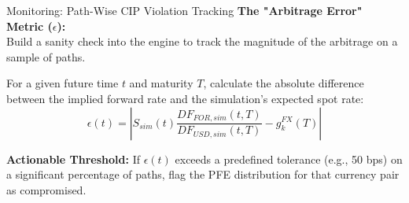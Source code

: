 \documentclass{beamer}
\begin{document}
%		
%		
%	
%		
%	
	\begin{frame}{Monitoring: Path-Wise CIP Violation Tracking}
		\textbf{The "Arbitrage Error" Metric ($\epsilon$):} \\
		Build a sanity check into the engine to track the magnitude of the arbitrage on a sample of paths.
		
		\vspace{0.3cm}
		For a given future time $t$ and maturity $T$, calculate the absolute difference between the implied forward rate and the simulation's expected spot rate:
		$$\epsilon(t) = \left| S_{sim}(t) \frac{DF_{FOR, sim}(t,T)}{DF_{USD, sim}(t,T)} - g_k^{FX}(T) \right|$$
		
		\vspace{0.3cm}
		\textbf{Actionable Threshold:}
		If $\epsilon(t)$ exceeds a predefined tolerance (e.g., 50 bps) on a significant percentage of paths, flag the PFE distribution for that currency pair as compromised.
	\end{frame}
	
\end{document}
